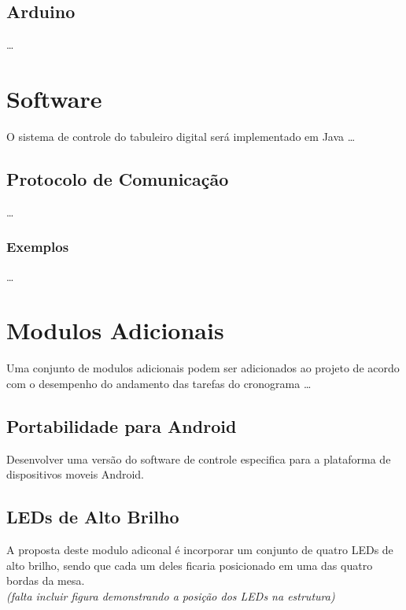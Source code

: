\documentclass[a4paper,10pt]{article}
\begin{document}
\subsection{Arduino}

\ldots

\section{Software}

O sistema de controle do tabuleiro digital será implementado em Java \ldots \\

\subsection{Protocolo de Comunicação}

\ldots

\subsubsection{Exemplos}

\ldots

\section{Modulos Adicionais}

Uma conjunto de modulos adicionais podem ser adicionados ao projeto de acordo com o desempenho do andamento das tarefas do cronograma \ldots

\subsection{Portabilidade para Android}

Desenvolver uma versão do software de controle especifica para a plataforma de
dispositivos moveis Android. 

\subsection{LEDs de Alto Brilho}

A proposta deste modulo adiconal é incorporar um conjunto de quatro LEDs de alto brilho, sendo que cada um deles ficaria posicionado em uma das quatro bordas da mesa. \\

{\it (falta incluir figura demonstrando a posição dos LEDs na estrutura)}
\end{document}
